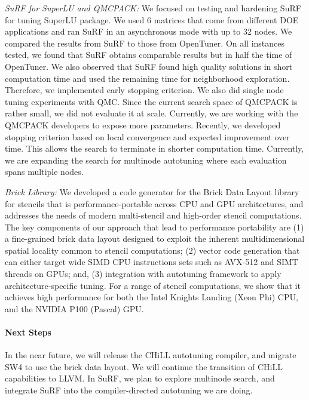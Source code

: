 \vspace*{.1in}
\noindent
\textit{SuRF for SuperLU and QMCPACK:} 
We focused on testing and hardening SuRF for tuning SuperLU package. We used 6 matrices that come from different DOE applications and ran SuRF in an asynchronous mode with up to 32 nodes. We compared the results from SuRF to those from OpenTuner. On all instances tested, we found that SuRF obtains comparable results but in half the time of OpenTuner. We also observed that SuRF found high quality solutions in short computation time and used the remaining time for neighborhood exploration. Therefore, we implemented early stopping criterion. We also did single node tuning experiments with QMC. Since the current search space of QMCPACK is rather small, we did not evaluate it at scale. Currently, we are working with the QMCPACK developers to expose more parameters.
Recently, we developed stopping criterion based on local convergence and expected improvement over time. This allows the search to terminate in shorter computation time. Currently, we are expanding the search for multinode autotuning where each evaluation spans multiple nodes.

\vspace*{.1in}
\noindent
\textit{Brick Library:}
We developed a code generator for the Brick Data Layout library for stencils that is performance-portable across CPU and GPU architectures, and addresses the needs of modern multi-stencil and high-order stencil computations. The key components of our approach that lead to performance portability are (1) a fine-grained brick data layout designed to exploit the inherent multidimensional spatial locality common to stencil computations; (2) vector code generation that can either target wide SIMD CPU instructions sets such as AVX-512 and SIMT threads on GPUs; and, (3) integration with autotuning framework to apply architecture-specific tuning. For a range of stencil computations, we show that it achieves high performance for both the Intel Knights Landing (Xeon Phi) CPU, and the NVIDIA P100 (Pascal) GPU.

\paragraph{Next Steps}
In the near future, we will release the CHiLL autotuning compiler, and migrate SW4 to use the brick data layout.  We will continue the transition of CHiLL capabilities to LLVM.
In SuRF, we plan to explore multinode search, and integrate SuRF into the compiler-directed autotuning we are doing.

